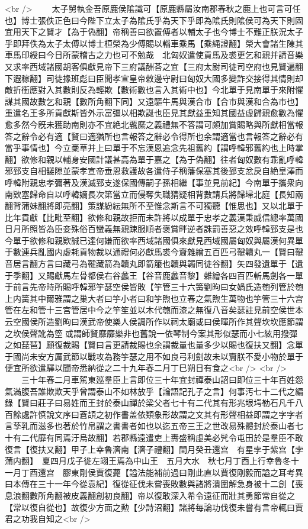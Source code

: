 <br />
　　太子舅執金吾原鹿侯隂識可【原鹿縣屬汝南郡春秋之鹿上也可言可任也】博士張佚正色曰今陛下立太子為隂氏乎為天下乎即為隂氏則隂侯可為天下則固宜用天下之賢才【為于偽翻】帝稱善曰欲置傅者以輔太子也今博士不難正朕況太子乎即拜佚為太子太傅以博士桓榮為少傅賜以輜車乘馬【乘䋲證翻】榮大會諸生陳其車馬印綬曰今日所蒙稽古之力也可不勉哉　北匈奴遣使貢馬及裘更乞和親并請音樂又求率西域諸國胡客俱獻見帝下三府議酬荅之宜【三府太尉司徒司空府也見賢遍翻下遐稼翻】司徒掾班彪曰臣聞孝宣皇帝敕邊守尉曰匈奴大國多變詐交接得其情則却敵折衝應對入其數則反為輕欺【數術數也言入其術中也】今北單于見南單于來附懼謀其國故數乞和親【數所角翻下同】又遠驅牛馬與漢合市【合市與漢和合為市也】重遣名王多所貢獻斯皆外示富彊以相欺誕也臣見其獻益重知其國益虚歸親愈數為懼愈多然今旣未獲助南則亦不宜絶北覊縻之義禮無不答謂可頗加賞賜略與所獻相當報答之辭令必有適【賢曰適猶所也言報答之辭必令得所也余謂適當也言報答之辭必有當乎事情也】今立稾草并上曰單于不忘漢恩追念先祖舊約【謂呼韓邪舊約也上時掌翻】欲修和親以輔身安國計議甚高為單于嘉之【為于偽翻】往者匈奴數有乖亂呼韓邪郅支自相讎隙並蒙孝宣帝垂恩救護故各遣侍子稱藩保塞其後郅支忿戾自絶皇澤而呼韓附親忠孝彌著及漢滅郅支遂保國傳嗣子孫相繼【事並見前紀】今南單于攜衆向南欵塞歸命自以呼韓嫡長次第當立而侵奪失職猜疑相背數請兵將歸埽北庭【長知兩翻背蒲妹翻將即亮翻】策謀紛紜無所不至惟念斯言不可獨聽【惟思也】又以北單于比年貢獻【比毗至翻】欲修和親故拒而未許將以成單于忠孝之義漢秉威信總率萬國日月所照皆為臣妾殊俗百蠻義無親踈服順者褒賞畔逆者誅罰善惡之效呼韓郅支是也今單于欲修和親欵誠已達何嫌而欲率西域諸國俱來獻見西域國屬匈奴與屬漢何異單于數連兵亂國内虚耗貢物裁以通禮何必獻馬裘今齎雜繒五百匹弓鞬韥丸一【賢曰鞬音居言翻方言曰藏弓為鞬藏箭為韥丸即箭箙也韥與韣同徒谷翻】矢四發遺單于【遺于季翻】又賜獻馬左骨都侯右谷蠡王【谷音鹿蠡音黎】雜繒各四百匹斬馬劍各一單于前言先帝時所賜呼韓邪竽瑟空侯皆敗【竽管三十六簧劉昫曰女媧氏造匏列管於匏上内簧其中爾雅謂之巢大者曰竽小者曰和竽煦也立春之氣煦生萬物也竽管三十六宫管在左和管十三宫管居中今之竽笙並以木代匏而漆之無復八音矣瑟註見前空侯世本云空國侯所造劉昫曰漢武帝使樂人侯調所作以祠太廟或曰侯暉所作其聲坎坎應節謂之坎侯聲訛為箜或謂師賢靡靡樂非也舊說一依琴制今案其形似瑟而小七絃用撥彈之如琵琶】願復裁賜【賢曰言更請裁賜也余謂裁量也量多少以賜也復扶又翻】念單于國尚未安方厲武節以戰攻為務竽瑟之用不如良弓利劍故未以齎朕不愛小物於單于便宜所欲遣驛以聞帝悉納從之二十九年春二月丁巳朔日有食之<br />
<br />
　　三十年春二月車駕東廵羣臣上言即位三十年宜封禪泰山詔曰即位三十年百姓怨氣滿腹吾誰欺欺天乎曾謂泰山不如林放乎【論語記孔子之言】何事汚七十二代之編錄【賢曰莊子曰易姓而王封於泰山禪於梁父者七十有二代其有形兆垠堮勒石凡千八百餘處許慎說文序曰蒼頡之初作書盖依類象形故謂之文其有形聲相益即謂之字字者言孶乳而滋多也著於竹帛謂之書書者如也以迄五帝三王之世改易殊體封於泰山者七十有二代靡有同焉汙烏故翻】若郡縣遠遣吏上夀盛稱虛美必髠令屯田於是羣臣不敢復言【復扶又翻】甲子上幸魯濟南【濟子禮翻】閏月癸丑還宫　有星孛于紫宫【孛蒲内翻】　夏四月戊子徙左翊王焉為中山王　五月大水　秋七月丁酉上行幸魯冬十一月丁酉還宫　膠東剛侯賈復薨【謚法能補前過曰剛此直以賈復剛毅而謚之耳考異曰本傳在三十一年今從袁紀】復從征伐未嘗喪敗數與諸將潰圍解急身被十二創【喪息浪翻數所角翻被皮義翻創初良翻】帝以復敢深入希令遠征而壯其勇節常自從之【常以復自從也】故復少方面之勲【少詩沼翻】諸將每論功伐復未嘗有言帝輒曰賈君之功我自知之<br />
